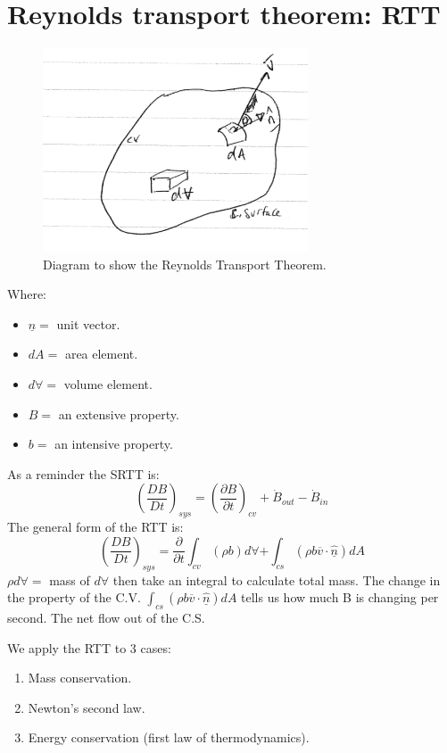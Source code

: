 \documentclass[class=report, crop=false, 12pt,a4paper]{standalone}
\begin{document}
\section{Reynolds transport theorem: RTT}
\begin{figure}
  \centering
  \includegraphics[width = 0.7\textwidth]{../img/RTTDiagram}
  \caption{Diagram to show the Reynolds Transport Theorem.}
\end{figure}
Where:
\begin{itemize}[noitemsep]
  \item $\underline{\hat{n}} =$ unit vector.
  \item $dA =$ area element.
  \item $d\forall =$ volume element.
  \item $B =$ an extensive property.
  \item $b =$ an intensive property.
\end{itemize}
As a reminder the SRTT is:
\begin{equation}
  \left( \frac{DB}{Dt} \right)_{sys} = \left( \frac{\partial B}{\partial t} \right)_{cv} + \dot{B}_{out} - \dot{B}_{in}
\end{equation}
The general form of the RTT is:
\begin{equation}
  \left( \frac{DB}{Dt} \right)_{sys} = \frac{\partial}{\partial t} \int_{cv} (\rho b) d\forall + \int_{cs} (\rho b \overline{v} \cdot \underline{\hat{n}}) dA
\end{equation}
$\rho d \forall =$ mass of $d\forall$ then take an integral to calculate total mass. The change in the property of the C.V. $\int_{cs} (\rho b \overline{v} \cdot \underline{\hat{n}}) dA$ tells us how much B is changing per second. The net flow out of the C.S.

We apply the RTT to 3 cases:
\begin{enumerate}[noitemsep]
  \item Mass conservation.
  \item Newton's second law.
  \item Energy conservation (first law of thermodynamics).
\end{enumerate}
\end{document}

